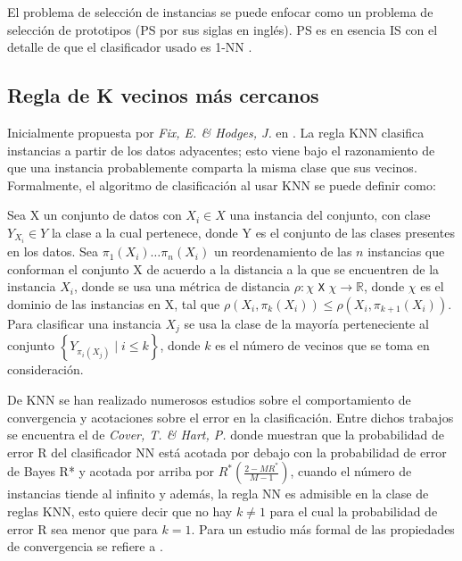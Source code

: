 El problema de selección de instancias se puede enfocar como un problema de selección de prototipos (PS por sus siglas en inglés). PS es en esencia IS con el detalle de que el clasificador usado es 1-NN \cite{garcia2016data}.

\subsection{Regla de K vecinos más cercanos}

Inicialmente propuesta por \emph{Fix, E. \& Hodges, J.} en \cite{fix1951discriminatory}. La regla KNN clasifica instancias a partir de los datos adyacentes; esto viene bajo el razonamiento de que una instancia probablemente comparta la misma clase que sus vecinos. Formalmente, el algoritmo de clasificación al usar KNN se puede definir como:\\  

\begin{definicion}
Sea X un conjunto de datos con $X_i\in X$ una instancia del conjunto, con clase $Y_{X_i}\in Y$ la clase a la cual pertenece, donde Y es el conjunto de las clases presentes en los datos. Sea $\pi_1(X_i)\dots \pi_n(X_i)$ un reordenamiento de las $n$ instancias que conforman el conjunto X de acuerdo a la distancia a la que se encuentren de la instancia $X_i$, donde se usa una métrica de distancia  $\rho:\chi$ \texttt{X} $\chi \rightarrow \mathbb{R}$, donde $\chi$ es el dominio de las instancias en X, tal que $\rho(X_i,\pi_k(X_i)) \leq \rho(X_i,\pi_{k+1}(X_i))$. Para clasificar una instancia $X_j$ se usa la clase de la mayoría perteneciente al conjunto $\left\{Y_{\pi_i(X_j)} \mid i \leq k\right\}$, donde $k$ es el número de vecinos que se toma en consideración. \cite{shalev2014understanding}
\end{definicion}

De KNN se han realizado numerosos estudios sobre el comportamiento de convergencia y acotaciones sobre el error en la clasificación. Entre dichos trabajos se encuentra el de \emph{Cover, T. \& Hart, P.} \cite{cover1967nearest} donde muestran que la probabilidad de error R del clasificador NN está acotada por debajo con la probabilidad de error de Bayes R* y acotada por arriba por $R^*(\frac{2-MR^*}{M-1})$, cuando el número de instancias tiende al infinito y además, la regla NN es admisible en la clase de reglas KNN, esto quiere decir que no hay $k\neq 1$ para el cual la probabilidad de error R sea menor que para $k=1$. Para un estudio más formal de las propiedades de convergencia se refiere a \cite{devroye2013probabilistic}.

